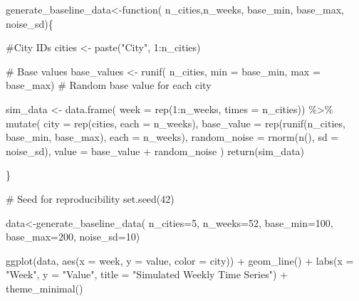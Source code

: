 \documentclass[
  letterpaper,
  DIV=11,
  numbers=noendperiod]{scrreprt}
\newenvironment{Shaded}{\begin{snugshade}}{\end{snugshade}}
\newcommand{\AttributeTok}[1]{\textcolor[rgb]{0.40,0.45,0.13}{#1}}
\newcommand{\CommentTok}[1]{\textcolor[rgb]{0.37,0.37,0.37}{#1}}
\newcommand{\ControlFlowTok}[1]{\textcolor[rgb]{0.00,0.23,0.31}{#1}}
\newcommand{\DecValTok}[1]{\textcolor[rgb]{0.68,0.00,0.00}{#1}}
\newcommand{\FunctionTok}[1]{\textcolor[rgb]{0.28,0.35,0.67}{#1}}
\newcommand{\NormalTok}[1]{\textcolor[rgb]{0.00,0.23,0.31}{#1}}
\newcommand{\OtherTok}[1]{\textcolor[rgb]{0.00,0.23,0.31}{#1}}
\newcommand{\SpecialCharTok}[1]{\textcolor[rgb]{0.37,0.37,0.37}{#1}}
\newcommand{\StringTok}[1]{\textcolor[rgb]{0.13,0.47,0.30}{#1}}
\begin{document}
\begin{Shaded}
\begin{Highlighting}[]
\NormalTok{generate\_baseline\_data}\OtherTok{\textless{}{-}}\ControlFlowTok{function}\NormalTok{(}
\NormalTok{    n\_cities,n\_weeks,}
\NormalTok{    base\_min, base\_max,}
\NormalTok{    noise\_sd)\{}

    \CommentTok{\#City ID\textquotesingle{}s}
\NormalTok{    cities }\OtherTok{\textless{}{-}} \FunctionTok{paste}\NormalTok{(}\StringTok{"City"}\NormalTok{, }\DecValTok{1}\SpecialCharTok{:}\NormalTok{n\_cities)}

    \CommentTok{\# Base values}
\NormalTok{    base\_values }\OtherTok{\textless{}{-}} \FunctionTok{runif}\NormalTok{(}
\NormalTok{      n\_cities,}
      \AttributeTok{min =}\NormalTok{ base\_min,}
      \AttributeTok{max =}\NormalTok{ base\_max)  }\CommentTok{\# Random base value for each city}

\NormalTok{    sim\_data }\OtherTok{\textless{}{-}} \FunctionTok{data.frame}\NormalTok{(}
      \AttributeTok{week =} \FunctionTok{rep}\NormalTok{(}\DecValTok{1}\SpecialCharTok{:}\NormalTok{n\_weeks, }\AttributeTok{times =}\NormalTok{ n\_cities)) }\SpecialCharTok{\%\textgreater{}\%}
      \FunctionTok{mutate}\NormalTok{(}
        \AttributeTok{city =} \FunctionTok{rep}\NormalTok{(cities, }\AttributeTok{each =}\NormalTok{ n\_weeks),}
        \AttributeTok{base\_value =} \FunctionTok{rep}\NormalTok{(}\FunctionTok{runif}\NormalTok{(n\_cities, base\_min, base\_max), }\AttributeTok{each =}\NormalTok{ n\_weeks),}
        \AttributeTok{random\_noise =} \FunctionTok{rnorm}\NormalTok{(}\FunctionTok{n}\NormalTok{(), }\AttributeTok{sd =}\NormalTok{ noise\_sd),}
        \AttributeTok{value =}\NormalTok{ base\_value }\SpecialCharTok{+}\NormalTok{ random\_noise}
\NormalTok{      )}
    \FunctionTok{return}\NormalTok{(sim\_data)}

\NormalTok{    \}}

\CommentTok{\# Seed for reproducibility}
\FunctionTok{set.seed}\NormalTok{(}\DecValTok{42}\NormalTok{)}

\NormalTok{data}\OtherTok{\textless{}{-}}\FunctionTok{generate\_baseline\_data}\NormalTok{(}
  \AttributeTok{n\_cities=}\DecValTok{5}\NormalTok{,}
  \AttributeTok{n\_weeks=}\DecValTok{52}\NormalTok{,}
  \AttributeTok{base\_min=}\DecValTok{100}\NormalTok{,}
  \AttributeTok{base\_max=}\DecValTok{200}\NormalTok{,}
  \AttributeTok{noise\_sd=}\DecValTok{10}\NormalTok{)}

\FunctionTok{ggplot}\NormalTok{(data, }\FunctionTok{aes}\NormalTok{(}\AttributeTok{x =}\NormalTok{ week, }\AttributeTok{y =}\NormalTok{ value, }\AttributeTok{color =}\NormalTok{ city)) }\SpecialCharTok{+}
  \FunctionTok{geom\_line}\NormalTok{() }\SpecialCharTok{+}
  \FunctionTok{labs}\NormalTok{(}\AttributeTok{x =} \StringTok{"Week"}\NormalTok{, }\AttributeTok{y =} \StringTok{"Value"}\NormalTok{, }\AttributeTok{title =} \StringTok{"Simulated Weekly Time Series"}\NormalTok{) }\SpecialCharTok{+}
  \FunctionTok{theme\_minimal}\NormalTok{()}
\end{Highlighting}
\end{Shaded}
\end{document}
